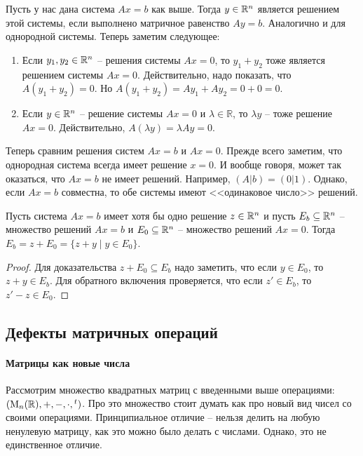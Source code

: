 Пусть у нас дана система $Ax = b$ как выше.
Тогда $y\in\mathbb R^{n}$ является решением этой системы, если выполнено матричное равенство $Ay = b$.
Аналогично и для однородной системы.
Теперь заметим следующее:
\begin{enumerate}
\item Если $y_1, y_2\in \mathbb R^{n}$ -- решения системы $Ax = 0$, то $y_1 + y_2$ тоже является решением системы $Ax = 0$.
Действительно, надо показать, что $A(y_1 + y_2) = 0$.
Но $A(y_1 + y_2) = A y_1 + Ay_2 = 0 + 0 = 0$.

\item Если $y\in\mathbb R^{n}$ -- решение системы $Ax = 0$ и $\lambda\in \mathbb R$, то $\lambda y$ -- тоже решение $Ax = 0$.
Действительно, $A(\lambda y) = \lambda Ay = 0$.
\end{enumerate}

Теперь сравним решения систем $Ax = b$ и $Ax = 0$.
Прежде всего заметим, что однородная система всегда имеет решение $x = 0$.
И вообще говоря, может так оказаться, что $Ax = b$ не имеет решений.
Например, $(A|b) = (0|1)$.
Однако, если $Ax = b$ совместна, то обе системы имеют <<одинаковое число>> решений.

\begin{claim*}
Пусть система $Ax = b$ имеет хотя бы одно решение $z\in\mathbb R^{n}$ и пусть $E_b\subseteq \mathbb R^{n}$ -- множество решений $Ax = b$ и $E_0\subseteq \mathbb R^{n}$ -- множество решений $Ax = 0$.
Тогда $E_b = z + E_0 = \{z +y\mid y\in E_0\}$.
\end{claim*}
\begin{proof}
Для доказательства $z + E_0 \subseteq E_b$ надо заметить, что если $y\in E_0$, то $z+y\in E_b$.
Для обратного включения проверяется, что если $z'\in E_b$, то $z' - z\in E_0$.
\end{proof}

\subsection{Дефекты матричных операций}
\label{section::MatOpsDefects}

\paragraph{Матрицы как новые числа}

Рассмотрим множество квадратных матриц с введенными выше операциями: $(\operatorname{M}_{n}(\mathbb R), +, -, \cdot, {}^t)$.
Про это множество стоит думать как про новый вид чисел со своими операциями.
Принципиальное отличие -- нельзя делить на любую ненулевую матрицу, как это можно было делать с числами.
Однако, это не единственное отличие.

